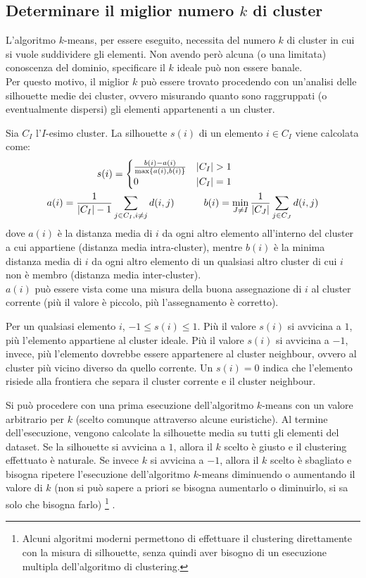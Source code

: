 \subsection{Determinare il miglior numero $k$ di cluster}
L'algoritmo $k$-means, per essere eseguito, necessita del numero $k$ di cluster
in cui si vuole suddividere gli elementi.
Non avendo però alcuna (o una limitata) conoscenza del dominio, specificare il
$k$ ideale può non essere banale.\\
Per questo motivo, il miglior $k$ può essere trovato procedendo con un'analisi
delle silhouette medie dei cluster, ovvero misurando quanto sono raggruppati
(o eventualmente dispersi) gli elementi appartenenti a un cluster.

Sia $C_I$ l'$I$-esimo cluster. La silhouette $s(i)$ di un elemento $i \in C_I$
viene calcolata come:
\begin{align*}
    s(i) &= \begin{cases}
        \frac{b(i)-a(i)}{\max\left\{a(i),b(i)\right\}} & |C_I| > 1\\
        0 & |C_I| = 1
    \end{cases}\\
    a(i) = \frac{1}{|C_I| - 1} &\sum\limits_{j \in C_I, i \neq j} d(i, j)
    \quad \quad \quad
    b(i) = \min\limits_{J \neq I} \frac{1}{|C_J|} \sum\limits_{j \in C_J} d(i,j)
\end{align*}
dove $a(i)$ è la distanza media di $i$ da ogni altro elemento all'interno del
cluster a cui appartiene (distanza media intra-cluster), mentre $b(i)$ è la
minima distanza media di $i$ da ogni altro elemento di un qualsiasi altro
cluster di cui $i$ non è membro (distanza media inter-cluster).\\
$a(i)$ può essere vista come una misura della buona assegnazione di $i$ al
cluster corrente (più il valore è piccolo, più l'assegnamento è corretto).

Per un qualsiasi elemento $i$, $-1 \le s(i) \le 1$. Più il valore $s(i)$ si
avvicina a $1$, più l'elemento appartiene al cluster ideale. Più il valore
$s(i)$ si avvicina a $-1$, invece, più l'elemento dovrebbe essere appartenere al
cluster neighbour, ovvero al cluster più vicino diverso da quello corrente.
Un $s(i) = 0$ indica che l'elemento risiede alla frontiera che separa il cluster
corrente e il cluster neighbour. 

Si può procedere con una prima esecuzione dell'algoritmo $k$-means con un valore
arbitrario per $k$ (scelto comunque attraverso alcune euristiche).
Al termine dell'esecuzione, vengono calcolate la silhouette media su tutti gli
elementi del dataset. Se la silhouette si avvicina a $1$, allora il $k$ scelto
è giusto e il clustering effettuato è naturale. 
Se invece $k$ si avvicina a $-1$, allora il $k$ scelto è sbagliato e bisogna
ripetere l'esecuzione dell'algoritmo $k$-means diminuendo o aumentando il valore
di $k$ (non si può sapere a priori se bisogna aumentarlo o diminuirlo, si sa
solo che bisogna farlo) 
\footnote{Alcuni algoritmi moderni permettono di effettuare il clustering
direttamente con la misura di silhouette, senza quindi aver bisogno di un
esecuzione multipla dell'algoritmo di clustering.}
.


